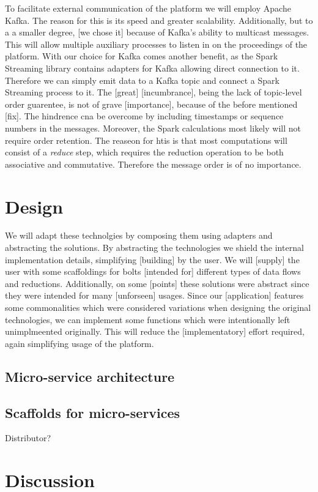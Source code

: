 To facilitate external communication of the platform we will employ Apache Kafka. The reason for this is its speed and greater scalability. Additionally, but to a a smaller degree, [we chose it] because of Kafka's ability to multicast messages. This will allow multiple auxiliary processes to listen in on the proceedings of the platform. With our choice for Kafka comes another benefit, as the Spark Streaming library contains adapters for Kafka allowing direct connection to it. Therefore we can simply emit data to a Kafka topic and connect a Spark Streaming process to it. The [great] [incumbrance], being the lack of topic-level order guarentee, is not of grave [importance], because of the before mentioned [fix]. The hindrence cna be overcome by including timestamps or sequence numbers in the messages. Moreover, the Spark calculations most likely will not require order retention. The reaseon for htis is that most computations will consist of a \emph{reduce} step, which requires the reduction operation to be both associative and commutative\cite{ass-comm}. Therefore the message order is of no importance.

\section{Design}
We will adapt these technolgies by composing them using adapters and abstracting the solutions. By abstracting the technologies we shield the internal implementation details, simplifying [building] by the user. We will [supply] the user with some scaffoldings for bolts [intended for] different types of data flows and reductions. Additionally, on some [points] these solutions were abstract since they were intended for many [unforseen] usages. Since our [application] features some commonalities which were considered variations when designing the original technologies, we can implement some functions which were intentionally left unimplmeented originally. This will reduce the [implementatory] effort required, again simplifying usage of the platform.

\subsection{Micro-service architecture}
\subsection{Scaffolds for micro-services}
Distributor?
\section{Discussion}





